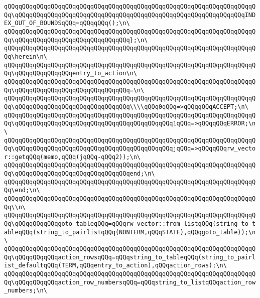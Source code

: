 \verb|qQQqqQQqqQQqqQQqqQQqqQQqqQQqqQQqqQQqqQQqqQQqqQQqqQQqqQQqqQQqqQQqqQQqqQQq\qQQqqQQqqQQqqQQqqQQqqQQqqQQqqQQqqQQqqQQqqQQqqQQqqQQqqQQqqQQqqQQqINDEX_OUT_OF_BOUNDSqQQq=qQQqqQQq();\n\|\newline
\verb|qQQqqQQqqQQqqQQqqQQqqQQqqQQqqQQqqQQqqQQqqQQqqQQqqQQqqQQqqQQqqQQqqQQqqQQq\qQQqqQQqqQQqqQQqqQQqqQQqqQQqqQQq};\n\|\newline
\verb|qQQqqQQqqQQqqQQqqQQqqQQqqQQqqQQqqQQqqQQqqQQqqQQqqQQqqQQqqQQqqQQqqQQqqQQq\herein\n\|\newline
\verb|qQQqqQQqqQQqqQQqqQQqqQQqqQQqqQQqqQQqqQQqqQQqqQQqqQQqqQQqqQQqqQQqqQQqqQQq\qQQqqQQqqQQqqQQqentry_to_action\n\|\newline
\verb|qQQqqQQqqQQqqQQqqQQqqQQqqQQqqQQqqQQqqQQqqQQqqQQqqQQqqQQqqQQqqQQqqQQqqQQq\qQQqqQQqqQQqqQQqqQQqqQQqqQQqqQQq=\n\|\newline
\verb|qQQqqQQqqQQqqQQqqQQqqQQqqQQqqQQqqQQqqQQqqQQqqQQqqQQqqQQqqQQqqQQqqQQqqQQq\qQQqqQQqqQQqqQQqqQQqqQQqqQQqqQQq\\\\qQQq0qQQq=>qQQqqQQqACCEPT;\n\|\newline
\verb|qQQqqQQqqQQqqQQqqQQqqQQqqQQqqQQqqQQqqQQqqQQqqQQqqQQqqQQqqQQqqQQqqQQqqQQq\qQQqqQQqqQQqqQQqqQQqqQQqqQQqqQQqqQQqqQQqqQQq1qQQq=>qQQqqQQqERROR;\n\|\newline
\verb|qQQqqQQqqQQqqQQqqQQqqQQqqQQqqQQqqQQqqQQqqQQqqQQqqQQqqQQqqQQqqQQqqQQqqQQq\qQQqqQQqqQQqqQQqqQQqqQQqqQQqqQQqqQQqqQQqqQQqjqQQq=>qQQqqQQqrw_vector::getqQQq(memo,qQQq(jqQQq-qQQq2));\n\|\newline
\verb|qQQqqQQqqQQqqQQqqQQqqQQqqQQqqQQqqQQqqQQqqQQqqQQqqQQqqQQqqQQqqQQqqQQqqQQq\qQQqqQQqqQQqqQQqqQQqqQQqqQQqqQQqend;\n\|\newline
\verb|qQQqqQQqqQQqqQQqqQQqqQQqqQQqqQQqqQQqqQQqqQQqqQQqqQQqqQQqqQQqqQQqqQQqqQQq\end;\n\|\newline
\verb|qQQqqQQqqQQqqQQqqQQqqQQqqQQqqQQqqQQqqQQqqQQqqQQqqQQqqQQqqQQqqQQqqQQqqQQq\\n\|\newline
\verb|qQQqqQQqqQQqqQQqqQQqqQQqqQQqqQQqqQQqqQQqqQQqqQQqqQQqqQQqqQQqqQQqqQQqqQQq\qQQqqQQqqQQqgoto_tableqQQq=qQQqrw_vector::from_listqQQq(string_to_tableqQQq(string_to_pairlistqQQq(NONTERM,qQQqSTATE),qQQqgoto_table));\n\|\newline
\verb|qQQqqQQqqQQqqQQqqQQqqQQqqQQqqQQqqQQqqQQqqQQqqQQqqQQqqQQqqQQqqQQqqQQqqQQq\qQQqqQQqqQQqaction_rowsqQQq=qQQqstring_to_tableqQQq(string_to_pairlist_defaultqQQq(TERM,qQQqentry_to_action),qQQqaction_rows);\n\|\newline
\verb|qQQqqQQqqQQqqQQqqQQqqQQqqQQqqQQqqQQqqQQqqQQqqQQqqQQqqQQqqQQqqQQqqQQqqQQq\qQQqqQQqqQQqaction_row_numbersqQQq=qQQqstring_to_listqQQqaction_row_numbers;\n\|\newline
